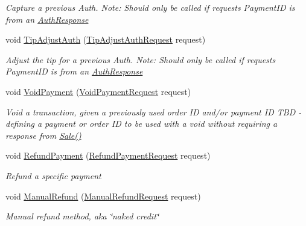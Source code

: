 \begin{DoxyCompactItemize}
\begin{DoxyCompactList}\small\item\em Capture a previous Auth. Note\+: Should only be called if request\textquotesingle{}s Payment\+ID is from an \hyperlink{classcom_1_1clover_1_1remotepay_1_1sdk_1_1_auth_response}{Auth\+Response} \end{DoxyCompactList}\item 
void \hyperlink{classcom_1_1clover_1_1remotepay_1_1sdk_1_1_clover_connector_a84fa27d8c605594999b39e619b20359e}{Tip\+Adjust\+Auth} (\hyperlink{classcom_1_1clover_1_1remotepay_1_1sdk_1_1_tip_adjust_auth_request}{Tip\+Adjust\+Auth\+Request} request)
\begin{DoxyCompactList}\small\item\em Adjust the tip for a previous Auth. Note\+: Should only be called if request\textquotesingle{}s Payment\+ID is from an \hyperlink{classcom_1_1clover_1_1remotepay_1_1sdk_1_1_auth_response}{Auth\+Response} \end{DoxyCompactList}\item 
void \hyperlink{classcom_1_1clover_1_1remotepay_1_1sdk_1_1_clover_connector_aa987ae8606b8b2f4a235e9c09ffeef3b}{Void\+Payment} (\hyperlink{classcom_1_1clover_1_1remotepay_1_1sdk_1_1_void_payment_request}{Void\+Payment\+Request} request)
\begin{DoxyCompactList}\small\item\em Void a transaction, given a previously used order ID and/or payment ID T\+BD -\/ defining a payment or order ID to be used with a void without requiring a response from \hyperlink{classcom_1_1clover_1_1remotepay_1_1sdk_1_1_clover_connector_a1adbcc8a0d4aaa82157a102af4f16b91}{Sale()} \end{DoxyCompactList}\item 
void \hyperlink{classcom_1_1clover_1_1remotepay_1_1sdk_1_1_clover_connector_a55f368cbaa89e2a8c47da3ba4a3a80aa}{Refund\+Payment} (\hyperlink{classcom_1_1clover_1_1remotepay_1_1sdk_1_1_refund_payment_request}{Refund\+Payment\+Request} request)
\begin{DoxyCompactList}\small\item\em Refund a specific payment \end{DoxyCompactList}\item 
void \hyperlink{classcom_1_1clover_1_1remotepay_1_1sdk_1_1_clover_connector_a0ecc7e8c3333a05853297c46adc8822c}{Manual\+Refund} (\hyperlink{classcom_1_1clover_1_1remotepay_1_1sdk_1_1_manual_refund_request}{Manual\+Refund\+Request} request)
\begin{DoxyCompactList}\small\item\em Manual refund method, aka \char`\"{}naked credit\char`\"{} \end{DoxyCompactList}\item 

\end{DoxyCompactItemize}

